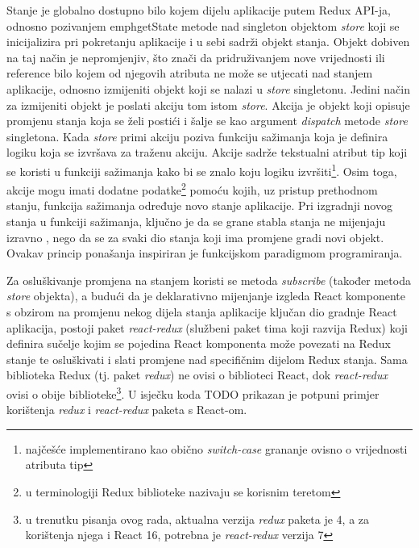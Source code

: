 \documentclass[times, utf8, diplomski, numeric]{fer}
\begin{document}
Stanje je globalno dostupno bilo kojem dijelu aplikacije putem Redux API-ja, odnosno pozivanjem emph{getState} metode nad singleton objektom \emph{store} koji se inicijalizira pri pokretanju aplikacije i u sebi sadrži objekt stanja. 
Objekt dobiven na taj način je nepromjenjiv, što znači da pridruživanjem nove vrijednosti ili reference bilo kojem od njegovih atributa ne može se utjecati nad stanjem aplikacije, odnosno izmijeniti objekt koji se nalazi u \emph{store} singletonu.
Jedini način za izmijeniti objekt je poslati  akciju tom istom \emph{store}.
Akcija  je objekt koji opisuje promjenu stanja koja se želi postići i šalje se kao argument \emph{dispatch} metode \emph{store} singletona.
Kada \emph{store} primi akciju poziva funkciju sažimanja  koja je definira logiku koja se izvršava za traženu akciju.
Akcije sadrže tekstualni atribut tip  koji se koristi u funkciji sažimanja kako bi se znalo koju logiku izvršiti\footnote{
    najčešće implementirano kao obično \emph{switch-case} grananje ovisno o vrijednosti atributa tip
}.
Osim toga, akcije mogu imati dodatne podatke\footnote{
    u terminologiji Redux biblioteke nazivaju se korisnim teretom 
} pomoću kojih, uz pristup prethodnom stanju, funkcija sažimanja određuje novo stanje aplikacije.
Pri izgradnji novog stanja u funkciji sažimanja, ključno je da se grane stabla stanja ne mijenjaju izravno , nego da se za svaki dio stanja koji ima promjene gradi novi objekt.
Ovakav princip ponašanja inspiriran je funkcijskom paradigmom programiranja\citep{redux}.

Za osluškivanje promjena na stanjem koristi se metoda \emph{subscribe} (također metoda \emph{store} objekta), a budući da je deklarativno mijenjanje izgleda React komponente s obzirom na promjenu nekog dijela stanja aplikacije ključan dio gradnje React aplikacija, postoji paket \emph{react-redux} (službeni paket tima koji razvija Redux) koji definira sučelje kojim se pojedina React komponenta može povezati  na Redux stanje te osluškivati i slati promjene nad specifičnim dijelom Redux stanja.
Sama biblioteka Redux (tj. paket \emph{redux}) ne ovisi o biblioteci React, dok \emph{react-redux} ovisi o obije biblioteke\footnote{
    u trenutku pisanja ovog rada, aktualna verzija \emph{redux} paketa je 4, a za korištenja njega i React 16, potrebna je \emph{react-redux} verzija 7
}.
U isječku koda TODO prikazan je potpuni primjer korištenja \emph{redux} i \emph{react-redux} paketa s React-om.
\end{document}
